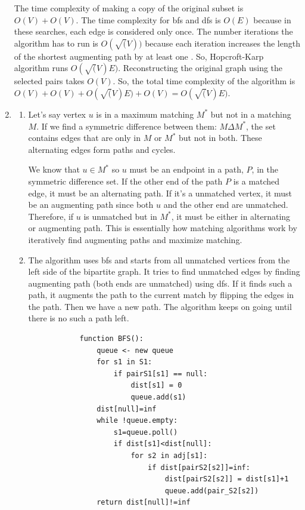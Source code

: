 \documentclass{article}
\begin{document}
\begin{enumerate}
    The time complexity of making a copy of the original subset is $O(V)+O(V)$.
    The time complexity for bfs and dfs is $O(E)$ because in these searches, each edge is considered only once.
    The number iterations the algorithm has to run is $O(\sqrt(V))$ because each iteration increases the length of the shortest augmenting path by at least one \cite{wiki}.
    So, Hopcroft-Karp algorithm runs $O(\sqrt(V)E)$.
    Reconstructing the original graph using the selected pairs takes $O(V)$.
    So, the total time complexity of the algorithm is $O(V)+O(V)+O(\sqrt(V)E)+O(V)=O(\sqrt(V)E)$.

    \item 
    
    \begin{enumerate}
        \item Let's say vertex $u$ is in a maximum matching $M^*$ but not in a matching $M$.
        If we find a symmetric difference between them: $M\Delta M^*$, the set contains edges that are only in $M$ or $M^*$ but not in both.
        These alternating edges form paths and cycles.

        We know that $u\in M^*$ so $u$ must be an endpoint in a path, $P$, in the symmetric difference set.
        If the other end of the path $P$ is a matched edge, it must be an alternating path.
        If it's a unmatched vertex, it must be an augmenting path since both $u$ and the other end are unmatched.
        Therefore, if $u$ is unmatched but in $M^*$, it must be either in alternating or augmenting path.
        This is essentially how matching algorithms work by iteratively find augmenting paths and maximize matching.

        \item The algorithm uses bfs and starts from all unmatched vertices from the left side of the bipartite graph.
        It tries to find unmatched edges by finding augmenting path (both ends are unmatched) using dfs.
        If it finds such a path, it augments the path to the current match by flipping the edges in the path.
        Then we have a new path.
        The algorithm keeps on going until there is no such a path left.

        \begin{lstlisting}
            function BFS():
                queue <- new queue
                for s1 in S1:
                    if pairS1[s1] == null:
                        dist[s1] = 0
                        queue.add(s1)
                dist[null]=inf
                while !queue.empty:
                    s1=queue.poll()
                    if dist[s1]<dist[null]:
                        for s2 in adj[s1]:
                            if dist[pairS2[s2]]=inf:
                                dist[pairS2[s2]] = dist[s1]+1
                                queue.add(pair_S2[s2])
                return dist[null]!=inf
    

\end{lstlisting}
\end{enumerate}
\end{enumerate}
\end{document}
